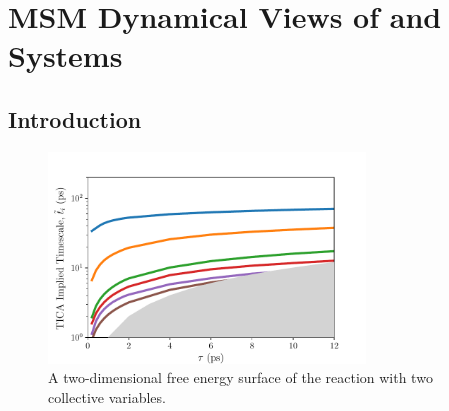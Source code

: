 \chapter{MSM Dynamical Views of  and  Systems}

\section{Introduction}

\begin{spacing}{2.0}
    \lipsum[1]

    \begin{figure}[H]
        \centering
        \includegraphics[width=0.75\textwidth]{./figs/fig3-01}
        \caption{A two-dimensional free energy surface of the  reaction with two collective variables.}
    \end{figure}
\end{spacing}
